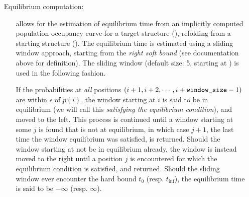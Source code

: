 \documentclass[11pt]{article}
\begin{document}
\begin{itemize}
\begin{itemize}
    \end{itemize}
  \item[Equilibrium computation:] \hfill
    \begin{itemize}
      \item[] \rnaeq allows for the estimation of equilibrium time from an implicitly computed population occupancy curve for a target structure (), refolding from a starting structure (). The equilibrium time is estimated using a sliding window approach, starting from the {\em right soft bound} \tStop (see documentation above for definition). The sliding window (default size: 5, starting at \tStop) is used in the following fashion.
      \item[] If the probabilities at {\em all} positions $(i + 1, i + 2, \cdots, i + \text{{\tt window\_size}} - 1)$ are within $\epsilon$ of $p(i)$, the window starting at $i$ is said to be in equilibrium (we will call this {\em satisfying the equilibrium condition}), and moved to the left. This process is continued until a window starting at some $j$ is found that is not at equilibrium, in which case $j + 1$, the last time the window equilibrium was satisfied, is returned. Should the window starting at \tStop not be in equilibrium already, the window is instead moved to the right until a position $j$ is encountered for which the equilibrium condition is satisfied, and returned. Should the sliding window ever encounter the hard bound $t_0$ (resp. $t_{\inf}$), the equilibrium time is said to be $-\infty$ (resp. $\infty$).

\end{itemize}
\end{itemize}
\end{document}
